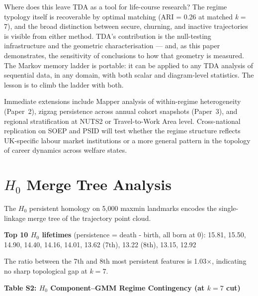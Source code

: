 Where does this leave TDA as a tool for life-course research? The regime typology itself is recoverable by optimal matching (ARI = 0.26 at matched \textit{k} = 7), and the broad distinction between secure, churning, and inactive trajectories is visible from either method. TDA's contribution is the null-testing infrastructure and the geometric characterisation --- and, as this paper demonstrates, the sensitivity of conclusions to how that geometry is measured. The Markov memory ladder is portable: it can be applied to any TDA analysis of sequential data, in any domain, with both scalar and diagram-level statistics. The lesson is to climb the ladder with both.

Immediate extensions include Mapper analysis of within-regime heterogeneity (Paper~2), zigzag persistence across annual cohort snapshots (Paper~3), and regional stratification at NUTS2 or Travel-to-Work Area level. Cross-national replication on SOEP and PSID will test whether the regime structure reflects UK-specific labour market institutions or a more general pattern in the topology of career dynamics across welfare states.



\appendix

\section{\texorpdfstring{$H_0$}{H0} Merge Tree Analysis}
\label{app:merge}

The $H_0$ persistent homology on 5,000 maxmin landmarks encodes the single-linkage merge tree of the trajectory point cloud.

\textbf{Top 10 $H_0$ lifetimes} (persistence = death - birth, all born at 0):
15.81, 15.50, 14.90, 14.40, 14.16, 14.01, 13.62 (7th), 13.22 (8th), 13.15, 12.92

The ratio between the 7th and 8th most persistent features is 1.03$\times$, indicating no sharp topological gap at $k = 7$.

\textbf{Table S2: $H_0$ Component--GMM Regime Contingency (at $k = 7$ cut)}

\noindent{}


